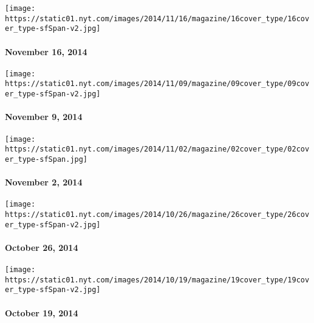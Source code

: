 \texttt{[image: https://static01.nyt.com/images/2014/11/16/magazine/16cover\_type/16cover\_type-sfSpan-v2.jpg]}

\hypertarget{november-16-2014}{%
\paragraph{November 16, 2014}\label{november-16-2014}}

\href{http://www.nytimes.com/indexes/2014/11/09/magazine/index.html}{}

\texttt{[image: https://static01.nyt.com/images/2014/11/09/magazine/09cover\_type/09cover\_type-sfSpan-v2.jpg]}

\hypertarget{november-9-2014}{%
\paragraph{November 9, 2014}\label{november-9-2014}}

\href{http://www.nytimes.com/indexes/2014/11/02/magazine/index.html}{}

\texttt{[image: https://static01.nyt.com/images/2014/11/02/magazine/02cover\_type/02cover\_type-sfSpan.jpg]}

\hypertarget{november-2-2014}{%
\paragraph{November 2, 2014}\label{november-2-2014}}

\href{http://www.nytimes.com/indexes/2014/10/26/magazine/index.html}{}

\texttt{[image: https://static01.nyt.com/images/2014/10/26/magazine/26cover\_type/26cover\_type-sfSpan-v2.jpg]}

\hypertarget{october-26-2014}{%
\paragraph{October 26, 2014}\label{october-26-2014}}

\href{http://www.nytimes.com/indexes/2014/10/19/magazine/index.html}{}

\texttt{[image: https://static01.nyt.com/images/2014/10/19/magazine/19cover\_type/19cover\_type-sfSpan-v2.jpg]}

\hypertarget{october-19-2014}{%
\paragraph{October 19, 2014}\label{october-19-2014}}

